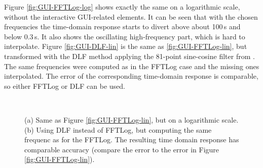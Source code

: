 \documentclass[extra, camera,%
    referee,     %
]{gji}
\newlength{\fwidth}
\begin{document}
Figure \ref{fig:GUI-FFTLog-log} shows exactly the same on a logarithmic scale,
without the interactive GUI-related elements. It can be seen that with the
chosen frequencies the time-domain response starts to divert above about 100\,s
and below 0.3\,s. It also shows the oscillating high-frequency part, which is
hard to interpolate. Figure \ref{fig:GUI-DLF-lin} is the same as
\ref{fig:GUI-FFTLog-lin}, but transformed with the DLF method applying the
81-point sine-cosine filter from \cite{GEO.09.Key}. The same frequencies were
computed as in the FFTLog case and the missing ones interpolated. The error of
the corresponding time-domain response is comparable, so either FFTLog or DLF
can be used.
%
\begin{figure}
  \centering
  \hfill
  \\
  \caption{(a) Same as Figure \ref{fig:GUI-FFTLog-lin}, but on a logarithmic
  scale. (b) Using DLF instead of FFTLog, but computing the same
  frequenc as for the FFTLog. The resulting time domain
  response has comparable accuracy (compare the error to the error in Figure
  \ref{fig:GUI-FFTLog-lin}).}
  \label{fig:GUI-log-lin}
\end{figure}
\end{document}
